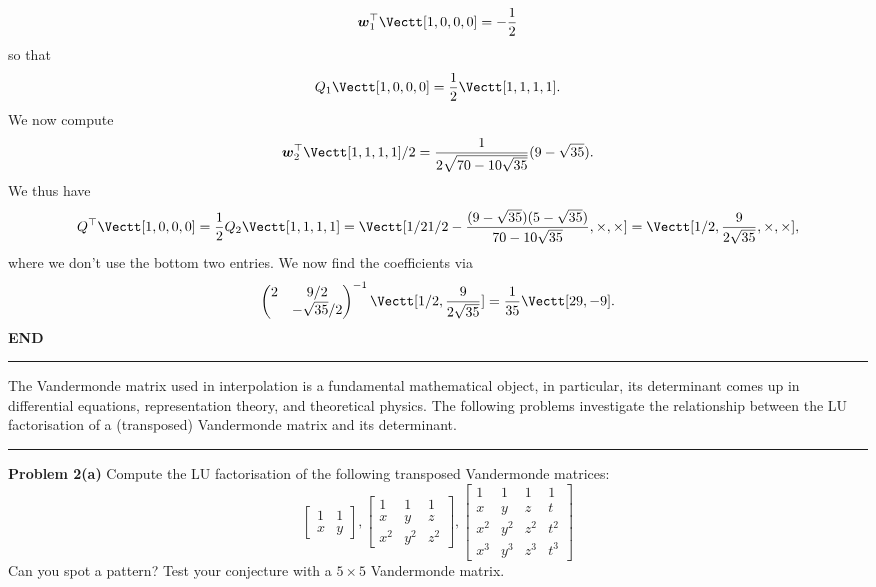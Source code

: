 \documentclass[12pt,a4paper]{article}
\def\w{ {\vc w} }
\begin{document}
\[
\ensuremath{\bm{\w}}_1^\ensuremath{\top}  \Vectt[1, 0,0,0]  = - {1 \over 2}
\]
so that 
\[
Q_1 \Vectt[1, 0, 0, 0] = {1 \over 2} \Vectt[
1,1,1,1].
\]
We now compute
\[
\ensuremath{\bm{\w}}_2^\ensuremath{\top} \Vectt[1,1,1,1]/2 = 
 {1 \over 2 \sqrt{70 - 10\sqrt{35}}} (9-\sqrt{35}).
\]
We thus have
\[
Q^\ensuremath{\top} \Vectt[1,0,0,0] = {1 \over 2}  Q_2 
\Vectt[
1,1,1,1] = 
\Vectt[
1/2
1/2 -  {(9-\sqrt{35}) (5-\sqrt{35}) \over  70 - 10\sqrt{35}} ,
\ensuremath{\times},
\ensuremath{\times}] = \Vectt[
1/2 ,
{9 \over 2 \sqrt{35}},
\ensuremath{\times},
\ensuremath{\times}],
\]
where we don't use the bottom two entries. We now find the coefficients via
\[
\begin{pmatrix}
2 & 9/2 \\
& -\sqrt{35}/2 
\end{pmatrix}^{-1} \Vectt[1/2, {9 \over 2 \sqrt{35}}] = 
{1 \over 35} \Vectt[
29,
-9].
\]
\textbf{END}

\rule{\textwidth}{1pt}
The Vandermonde matrix used in interpolation is a fundamental mathematical object, in particular, its determinant comes up in differential equations, representation theory, and theoretical physics. The following problems investigate the relationship between the LU factorisation of a (transposed) Vandermonde matrix and its determinant.

\rule{\textwidth}{1pt}
\textbf{Problem 2(a)} Compute the LU factorisation of the following transposed Vandermonde matrices:
\[
\begin{bmatrix}
1 & 1 \\
x & y
\end{bmatrix},
\begin{bmatrix}
1 & 1 & 1 \\
x & y & z \\
x^2 & y^2 & z^2
\end{bmatrix},
\begin{bmatrix}
1 & 1 & 1 & 1 \\
x & y & z & t \\
x^2 & y^2 & z^2 & t^2 \\
x^3 & y^3 & z^3 & t^3
\end{bmatrix}
\]
Can you spot a pattern? Test your conjecture with a $5 \ensuremath{\times} 5$ Vandermonde matrix.
\end{document}
